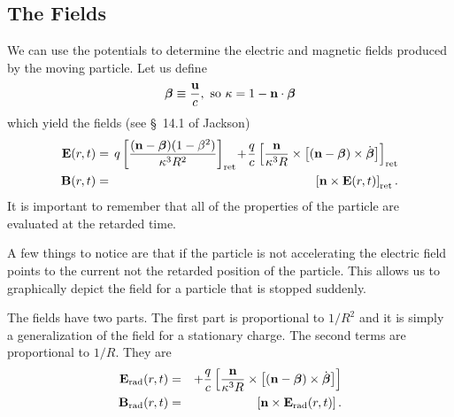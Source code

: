 \subsection{The Fields}
\label{sec:fields}
We can use the potentials to determine the electric and magnetic
fields produced by the moving particle.  Let us define
\begin{equation}
\mbox{\boldmath $\beta$} \equiv \frac{\bf u}{c},~\hbox{\rm so}~ \kappa = 1 - {\bf n} \cdot \mbox{\boldmath $\beta$}
\label{eq:196}
\end{equation}
which yield the fields (see \S~14.1 of Jackson)
\begin{eqnarray}
{\bf E}(r,t) &=& \kern-2mm q \left [ \frac{({\bf n} - \betabold)(1-\beta^2)}{\kappa^3 R^2} \right ]_\mathrm{ret}\!+\!\frac{q}{c} \left [ \frac{\bf n}{\kappa^3 R} \times \left [ 
({\bf n} - \betabold ) \times \dot{\betabold} \right ]\right ]_\mathrm{ret} \\
{\bf B}(r,t) &=& \kern-2mm\left [ {\bf n} \times {\bf E}(r,t) \right ]_\mathrm{ret}.
\label{eq:197}
\end{eqnarray}
It is important to remember that all of the properties of the particle
are evaluated at the retarded time.

A few things to notice are that if the particle is not accelerating
the electric field points to the current not the retarded position of
the particle.  This allows us to graphically depict the field for a
particle that is stopped suddenly.

The fields have two parts.  The first part is proportional to $1/R^2$
and it is simply a generalization of the field for a stationary
charge.  The second terms are proportional to $1/R$.  They are
\begin{eqnarray}
{\bf E}_{\hbox{\rm \scriptsize rad}}(r,t) &=& + \frac{q}{c} \left [ \frac{\bf n}{\kappa^3 R} \times \left [ 
({\bf n} - \mbox{\boldmath $\beta$} ) \times \dot{\mbox{\boldmath $\beta$}} \right ]\right ] \\
{\bf B}_{\hbox{\rm \scriptsize rad}}(r,t) &=& \left [ {\bf n} \times {\bf E}_{\hbox{\rm \scriptsize rad}}(r,t) \right ].
\label{eq:198}
\end{eqnarray}

